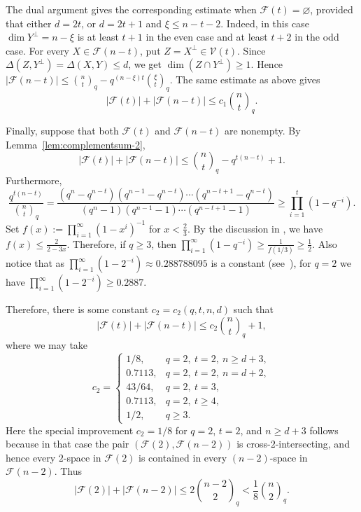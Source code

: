\documentclass[11pt]{article}
\theoremstyle{definition}
\newcommand{\qbinom}[2]{\genfrac{(}{)}{0pt}{}{#1}{#2}_q}
\begin{document}
The dual argument gives the corresponding estimate when $\mathcal F(t)=\varnothing$, provided that either $d=2t$, or $d=2t+1$ and $\xi\le n-t-2$. 
Indeed, in this case $\dim Y^\perp=n-\xi$ is at least $t+1$ in the even case and at least $t+2$ in the odd case. 
For every $X\in\mathcal F(n-t)$, put $Z=X^\perp\in\mathcal V(t)$. 
Since $\Delta(Z,Y^\perp)=\Delta(X,Y)\le d$, we get
\(
\dim(Z\cap Y^\perp)\ge 1.
\)
Hence
\(
|\mathcal F(n-t)|
\le
\qbinom{n}{t}
-
q^{(n-\xi)t}\qbinom{\xi}{t}.
\)
The same estimate as above gives
\begin{equation}\label{eq:c1-B}
|\mathcal F(t)|+|\mathcal F(n-t)|
\le
c_1\qbinom{n}{t}.
\end{equation}

Finally, suppose that both $\mathcal F(t)$ and $\mathcal F(n-t)$ are nonempty. 
By Lemma~\ref{lem:complementsum-2},
\[
|\mathcal F(t)|+|\mathcal F(n-t)|
\le
\qbinom{n}{t}-q^{t(n-t)}+1.
\]
Furthermore,
\begin{equation*}
\frac{q^{t(n-t)}}{\qbinom{n}{t}}
=
\frac{(q^n-q^{n-t})(q^{n-1}-q^{n-t})\cdots(q^{n-t+1}-q^{n-t})}
{(q^n-1)(q^{n-1}-1)\cdots(q^{n-t+1}-1)}
\ge
\prod_{i=1}^{t}(1-q^{-i}).
\end{equation*}
Set $f(x) := \prod_{i=1}^{\infty} (1 - x^i)^{-1}$ for $x < \tfrac{2}{3}$. By the discussion in \cite{LLY2026}, we have $f(x) \leqslant \frac{2}{2 - 3x}$. Therefore, if $q \geqslant 3$, then $\prod_{i=1}^{\infty} (1 - q^{-i}) \geqslant \frac{1}{f(1/3)} \geqslant \frac{1}{2}$. Also notice that as $\prod_{i=1}^{\infty} (1 - 2^{-i}) \approx 0.288788095$ is a constant (see~\cite{B1980}), for $q=2$ we have
$\prod_{i=1}^{\infty} \left(1 - 2^{-i}\right) \geqslant 0.2887$.

Therefore, there is some constant $c_2=c_2(q,t,n,d)$ such that
\begin{equation}\label{eq:c2}
|\mathcal F(t)|+|\mathcal F(n-t)|
\le
c_2\qbinom{n}{t}+1,
\end{equation}
where we may take
\[
c_2=
\begin{cases}
1/8, & q=2,\ t=2,\ n\ge d+3,\\
0.7113, & q=2,\ t=2,\ n=d+2,\\
43/64, & q=2,\ t=3,\\
0.7113, & q=2,\ t\ge 4,\\
1/2, & q\ge 3.
\end{cases}
\]
Here the special improvement $c_2=1/8$ for $q=2$, $t=2$, and $n\ge d+3$ follows because in that case the pair $(\mathcal F(2),\mathcal F(n-2))$ is cross-$2$-intersecting, and hence every $2$-space in $\mathcal F(2)$ is contained in every $(n-2)$-space in $\mathcal F(n-2)$. Thus
\[
|\mathcal F(2)|+|\mathcal F(n-2)|
\le
2\qbinom{n-2}{2}
<
\frac18\qbinom{n}{2}.
\]
\end{document}
